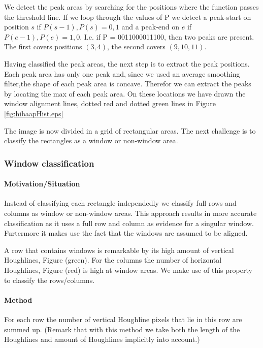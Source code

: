 We detect the peak areas by searching for the positions where the function
passes the threshold line. 
If we loop through the values of P we detect a peak-start on position $s$ if ${P(s-1),P(s)}={0,1}$
and a peak-end on $e$ if ${P(e-1),P(e)}={1,0}$. 
I.e. if P = 0011000011100, then two peaks are present. The first covers positions $(3,4)$, 
the second covers $(9,10,11)$. 

Having classified the peak areas, the next step is to extract the peak positions. 
Each peak area has only one peak and, since we used an average smoothing filter,the shape of each  
peak area is concave. Therefor we can extract the peaks
by locating the max of each peak area. 
On these locations we have drawn the window alignment lines, dotted red and dotted green lines
in Figure \ref{fig:hibaapHist.eps}

The image is now divided in a grid of rectangular areas. The next challenge is to 
classify the rectangles as a window or non-window area.

\subsubsection{Window classification}
\paragraph{Motivation/Situation}
Instead of classifying each rectangle independedly we classify full rows and
columns as window or non-window areas.  This approach results in more accurate
classification as it uses a full row and column as evidence for a singular
window. Furtermore it makes use the fact that the windows are assumed to be
aligned.

A row that contains windows is remarkable by its high amount of vertical
Houghlines, Figure %
(green). For the columns the number of horizontal Houghlines, Figure %
 (red) is high at window areas.  We make use of this property to classify 
 the rows/columns.

\paragraph{Method}
For each row the number of vertical Houghline pixels that lie in this row are summed up.
(Remark that with this method we take both the length of the Houghlines and amount of Houghlines 
implicitly into account.)

